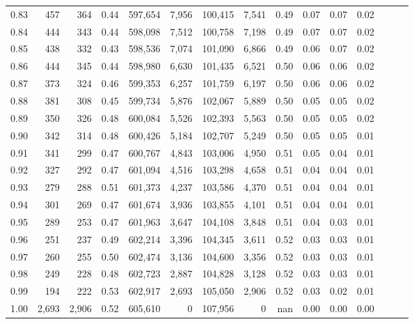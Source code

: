 \begin{tabular}{rrrrrrrrrrrrrrr}
0.83 &     457 &    364 &  0.44 &  597,654 &    7,956 &  100,415 &    7,541 &  0.49 &  0.07 &  0.07 &      0.02 \\
0.84 &     444 &    343 &  0.44 &  598,098 &    7,512 &  100,758 &    7,198 &  0.49 &  0.07 &  0.07 &      0.02 \\
0.85 &     438 &    332 &  0.43 &  598,536 &    7,074 &  101,090 &    6,866 &  0.49 &  0.06 &  0.07 &      0.02 \\
0.86 &     444 &    345 &  0.44 &  598,980 &    6,630 &  101,435 &    6,521 &  0.50 &  0.06 &  0.06 &      0.02 \\
0.87 &     373 &    324 &  0.46 &  599,353 &    6,257 &  101,759 &    6,197 &  0.50 &  0.06 &  0.06 &      0.02 \\
0.88 &     381 &    308 &  0.45 &  599,734 &    5,876 &  102,067 &    5,889 &  0.50 &  0.05 &  0.05 &      0.02 \\
0.89 &     350 &    326 &  0.48 &  600,084 &    5,526 &  102,393 &    5,563 &  0.50 &  0.05 &  0.05 &      0.02 \\
0.90 &     342 &    314 &  0.48 &  600,426 &    5,184 &  102,707 &    5,249 &  0.50 &  0.05 &  0.05 &      0.01 \\
0.91 &     341 &    299 &  0.47 &  600,767 &    4,843 &  103,006 &    4,950 &  0.51 &  0.05 &  0.04 &      0.01 \\
0.92 &     327 &    292 &  0.47 &  601,094 &    4,516 &  103,298 &    4,658 &  0.51 &  0.04 &  0.04 &      0.01 \\
0.93 &     279 &    288 &  0.51 &  601,373 &    4,237 &  103,586 &    4,370 &  0.51 &  0.04 &  0.04 &      0.01 \\
0.94 &     301 &    269 &  0.47 &  601,674 &    3,936 &  103,855 &    4,101 &  0.51 &  0.04 &  0.04 &      0.01 \\
0.95 &     289 &    253 &  0.47 &  601,963 &    3,647 &  104,108 &    3,848 &  0.51 &  0.04 &  0.03 &      0.01 \\
0.96 &     251 &    237 &  0.49 &  602,214 &    3,396 &  104,345 &    3,611 &  0.52 &  0.03 &  0.03 &      0.01 \\
0.97 &     260 &    255 &  0.50 &  602,474 &    3,136 &  104,600 &    3,356 &  0.52 &  0.03 &  0.03 &      0.01 \\
0.98 &     249 &    228 &  0.48 &  602,723 &    2,887 &  104,828 &    3,128 &  0.52 &  0.03 &  0.03 &      0.01 \\
0.99 &     194 &    222 &  0.53 &  602,917 &    2,693 &  105,050 &    2,906 &  0.52 &  0.03 &  0.02 &      0.01 \\
1.00 &   2,693 &  2,906 &  0.52 &  605,610 &        0 &  107,956 &        0 &   nan &  0.00 &  0.00 &      0.00 \\
\bottomrule
\end{tabular}
